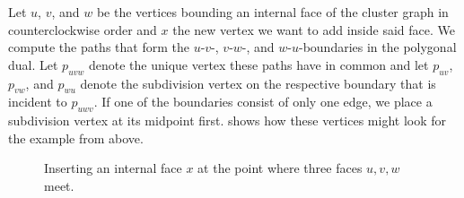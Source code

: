 Let $u$, $v$, and $w$ be the vertices bounding an internal face of the cluster graph in counterclockwise order and $x$ the new vertex we want to add inside said face.
We compute the paths that form the $u$-$v$-, $v$-$w$-, and $w$-$u$-boundaries in the polygonal dual.
Let $p_{uvw}$ denote the unique vertex these paths have in common and let $p_{uv}$, $p_{vw}$, and $p_{wu}$ denote the subdivision vertex on the respective boundary that is incident to $p_{uwv}$.
If one of the boundaries consist of only one edge, we place a subdivision vertex at its midpoint first.
 shows how these vertices might look for the example from above.

\begin{figure}[H]
	\centering
	\quad
	\quad
	\caption{Inserting an internal face $x$ at the point where three faces $u,v,w$ meet.}
	\label{fig:insert-vertex-illustration}
\end{figure}

